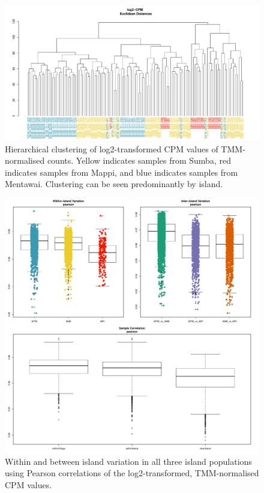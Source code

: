 \documentclass[12pt,a4paper,titlepage,twoside,openright]{book}
\begin{document}
\begin{mainmatter}
{\begin{figure}[htb!]
\centering
\includegraphics[width=\textwidth,height=\textheight,keepaspectratio]{Figures/SampleDistances_Euclidean.pdf}
\caption{Hierarchical clustering of log2-transformed CPM values of TMM- normalised counts. Yellow indicates samples from Sumba, red indicates samples from Mappi, and blue indicates samples from Mentawai. Clustering can be seen predominantly by island.}
\label{fig:Euclidean Sample Distances}
\end{figure}

\begin{figure}[htb!]
\centering
\includegraphics[width=\textwidth,height=\textheight,keepaspectratio]{Figures/IslandVariation_pearson.pdf}
\caption{Within and between island variation in all three island populations using Pearson correlations of the log2-transformed, TMM-normalised CPM values.}
\label{fig:Island Variation}
\end{figure}

}
\end{mainmatter}
\end{document}

